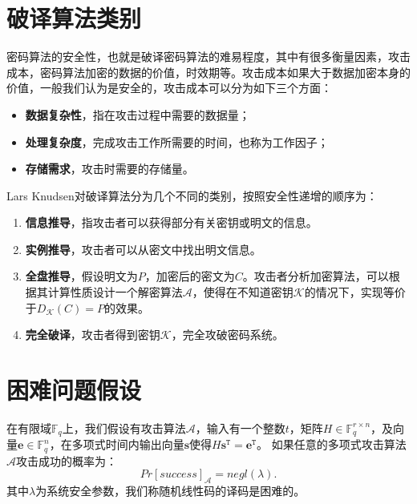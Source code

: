 \section{破译算法类别}
密码算法的安全性，也就是破译密码算法的难易程度，其中有很多衡量因素，攻击成本，密码算法加密的数据的价值，时效期等。攻击成本如果大于数据加密本身的价值，一般我们认为是安全的，攻击成本可以分为如下三个方面：
\begin{itemize}
	\item \textbf{数据复杂性}，指在攻击过程中需要的数据量；
	\item \textbf{处理复杂度}，完成攻击工作所需要的时间，也称为工作因子；
	\item \textbf{存储需求}，攻击时需要的存储量。
\end{itemize}

\begin{flushleft}
	Lars Knudsen对破译算法分为几个不同的类别，按照安全性递增的顺序为：
\end{flushleft}
\begin{enumerate}
	\item \textbf{信息推导}，指攻击者可以获得部分有关密钥或明文的信息。
	\item \textbf{实例推导}，攻击者可以从密文中找出明文信息。
	\item \textbf{全盘推导}，假设明文为$P$，加密后的密文为$C$。攻击者分析加密算法，可以根据其计算性质设计一个解密算法$\mathcal{A}$，使得在不知道密钥$\mathcal{K}$的情况下，实现等价于$D_\mathcal{K}(C) = P$的效果。
	\item \textbf{完全破译}，攻击者得到密钥$\mathcal{K}$，完全攻破密码系统。
\end{enumerate}

\section{困难问题假设}

\begin{define}[随机线性码的译码困难问题]
	在有限域$\mathbb{F}_q$上，我们假设有攻击算法$\mathcal{A}$，输入有一个整数$t$，矩阵$H \in \mathbb{F}_q^{r \times n}$，及向量$\mathbf{e} \in \mathbb{F}_q^n$，在多项式时间内输出向量$\mathbf{s}$使得$H\mathbf{s}^\mathtt{T} = \mathbf{e}^\mathtt{T}$。
	如果任意的多项式攻击算法$\mathcal{A}$攻击成功的概率为：
	\begin{equation}
		Pr[success]_\mathcal{A} = negl(\lambda).
	\end{equation}
	其中$\lambda$为系统安全参数，我们称随机线性码的译码是困难的。
\end{define}

